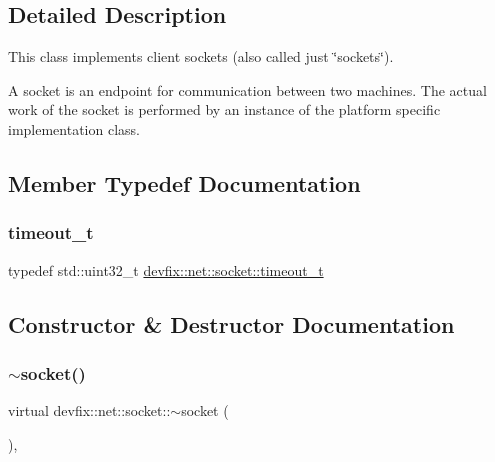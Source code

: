 \subsection{Detailed Description}
This class implements client sockets (also called just \char`\"{}sockets\char`\"{}). 

A socket is an endpoint for communication between two machines. The actual work of the socket is performed by an instance of the platform specific implementation class. 

\subsection{Member Typedef Documentation}
\mbox{\label{structdevfix_1_1net_1_1socket_a80a3bf4cb7292bae31ea9c6575539c68}} 
\subsubsection{\texorpdfstring{timeout\+\_\+t}{timeout\_t}}
{\footnotesize\ttfamily typedef std\+::uint32\+\_\+t \hyperlink{structdevfix_1_1net_1_1socket_a80a3bf4cb7292bae31ea9c6575539c68}{devfix\+::net\+::socket\+::timeout\+\_\+t}}



\subsection{Constructor \& Destructor Documentation}
\mbox{\label{structdevfix_1_1net_1_1socket_ad9d4d9643894e213faefd4e37938f1fe}} 
\subsubsection{\texorpdfstring{$\sim$socket()}{~socket()}}
{\footnotesize\ttfamily virtual devfix\+::net\+::socket\+::$\sim$socket (\begin{DoxyParamCaption}{ }\end{DoxyParamCaption})\hspace{0.3cm}{\ttfamily [virtual]}, {\ttfamily [default]}}



